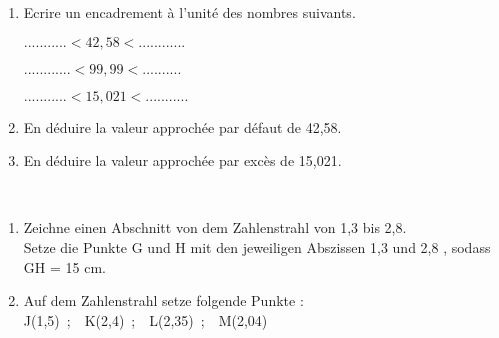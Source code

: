\begin{enumerate}
\item Ecrire un encadrement \`a l'unit\'e des nombres suivants.
\begin{multicols}{3}
\setlength{\columnseprule}{0pt}
$...........<42,58<............$

\columnbreak

$............<99,99<..........$

\columnbreak

$...........<15,021<...........$

\end{multicols}
\item En d\'eduire la valeur approch\'ee par d\'efaut de 42,58.
\vspace{1cm}
\item En d\'eduire la valeur approch\'ee par exc\`es de 15,021.
\end{enumerate}

\\
\begin{enumerate}
\item Zeichne einen Abschnitt von dem Zahlenstrahl von 1,3 bis 2,8.\\
Setze die Punkte G und H mit den jeweiligen Abszissen 1,3 und 2,8 , sodass GH = 15 cm.    
\item Auf dem Zahlenstrahl setze folgende Punkte : \\
J(1,5)~;~~K(2,4)~;~~L(2,35)~;~~M(2,04)
\end{enumerate}

